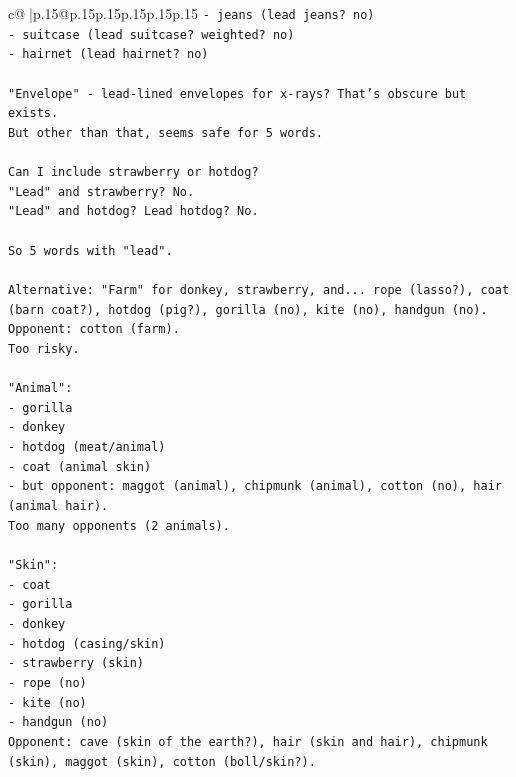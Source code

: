 \documentclass{article}
\begin{document}
{\begin{supertabular}{c@{$\;$}|p{.15\linewidth}@{}p{.15\linewidth}p{.15\linewidth}p{.15\linewidth}p{.15\linewidth}p{.15\linewidth}}
{{{\texttt{{-} jeans (lead jeans? no)} \\
\texttt{{-} suitcase (lead suitcase? weighted? no)} \\
\texttt{{-} hairnet (lead hairnet? no)} \\
\\ 
\texttt{"Envelope" {-} lead{-}lined envelopes for x{-}rays? That's obscure but exists.} \\
\texttt{But other than that, seems safe for 5 words.} \\
\\ 
\texttt{Can I include strawberry or hotdog?} \\
\texttt{"Lead" and strawberry? No.} \\
\texttt{"Lead" and hotdog? Lead hotdog? No.} \\
\\ 
\texttt{So 5 words with "lead".} \\
\\ 
\texttt{Alternative: "Farm" for donkey, strawberry, and... rope (lasso?), coat (barn coat?), hotdog (pig?), gorilla (no), kite (no), handgun (no).} \\
\texttt{Opponent: cotton (farm).} \\
\texttt{Too risky.} \\
\\ 
\texttt{"Animal":} \\
\texttt{{-} gorilla} \\
\texttt{{-} donkey} \\
\texttt{{-} hotdog (meat/animal)} \\
\texttt{{-} coat (animal skin)} \\
\texttt{{-} but opponent: maggot (animal), chipmunk (animal), cotton (no), hair (animal hair).} \\
\texttt{Too many opponents (2 animals).} \\
\\ 
\texttt{"Skin":} \\
\texttt{{-} coat} \\
\texttt{{-} gorilla} \\
\texttt{{-} donkey} \\
\texttt{{-} hotdog (casing/skin)} \\
\texttt{{-} strawberry (skin)} \\
\texttt{{-} rope (no)} \\
\texttt{{-} kite (no)} \\
\texttt{{-} handgun (no)} \\
\texttt{Opponent: cave (skin of the earth?), hair (skin and hair), chipmunk (skin), maggot (skin), cotton (boll/skin?).} \\
}}}
\end{supertabular}}
\end{document}
